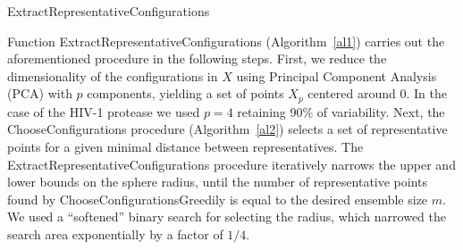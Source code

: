 \documentclass[a4paper,11pt,twoside]{book}%
\begin{document}
\begin{appendices}
\begin{algorithm}
\DontPrintSemicolon
\SetAlgoLined
{}
\caption{ExtractRepresentativeConfigurations}
\label{al1}

\end{algorithm}

Function ExtractRepresentativeConfigurations (Algorithm~\ref{al1}) carries out the aforementioned procedure in the following steps.
First, we reduce the dimensionality of the configurations in $X$ using Principal Component Analysis (PCA) with $p$ components, yielding a set of points $X_p$ centered around 0.
In the case of the HIV-1 protease we used $p=4$ retaining 90\% of variability.
Next, the ChooseConfigurations procedure (Algorithm~\ref{al2}) selects a set of representative points for a given minimal distance between representatives.
The ExtractRepresentativeConfigurations procedure iteratively narrows the upper and lower bounds on the sphere radius, until the number of representative points found by ChooseConfigurationsGreedily is equal to the desired ensemble size $m$.
We used a ``softened'' binary search for selecting the radius, which narrowed the search area exponentially by a factor of $1/4$. 


\end{appendices}
\end{document}
